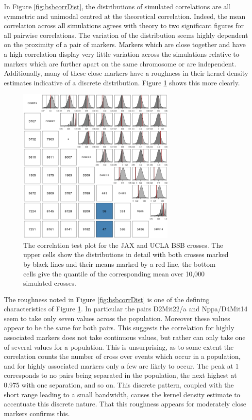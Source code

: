 \documentclass{article}
\begin{document}
In Figure \ref{fig:bsbcorrDist}, the distributions of simulated correlations are all symmetric and unimodal centred at the theoretical correlation. Indeed, the mean correlation across all simulations agrees with theory to two significant figures for all pairwise correlations. The variation of the distribution seems highly dependent on the proximity of a pair of markers. Markers which are close together and have a high correlation display very little variation across the simulations relative to markers which are further apart on the same chromosome or are independent. Additionally, many of these close markers have a roughness in their kernel density estimates indicative of a discrete distribution. Figure \ref{fig:bsbcorrTest} shows this more clearly.

\begin{figure}[htp]
  \begin{center}
      \includegraphics[width = 0.7\textwidth]{./img/bsbCorrTest.png}
  \end{center}
  \caption{The correlation test plot for the JAX and UCLA BSB crosses. The upper cells show the distributions in detail with both crosses marked by black lines and their means marked by a red line, the bottom cells give the quantile of the corresponding mean over 10,000 simulated crosses.}
  \label{fig:bsbcorrTest}
\end{figure}

The roughness noted in Figure \ref{fig:bsbcorrDist} is one of the defining characteristics of Figure \ref{fig:bsbcorrTest}. In particular the pairs D2Mit22/a and Nppa/D4Mit14 seem to take only seven values across the population. Moreover these values appear to be the same for both pairs. This suggests the correlation for highly associated markers does not take continuous values, but rather can only take one of several values for a population. This is unsurprising, as to some extent the correlation counts the number of cross over events which occur in a population, and for highly associated markers only a few are likely to occur. The peak at 1 corresponds to no pairs being separated in the population, the next highest at 0.975 with one separation, and so on. This discrete pattern, coupled with the short range leading to a small bandwidth, causes the kernel density estimate to accentuate this discrete nature. That this roughness appears for moderately close markers confirms this.
\end{document}
